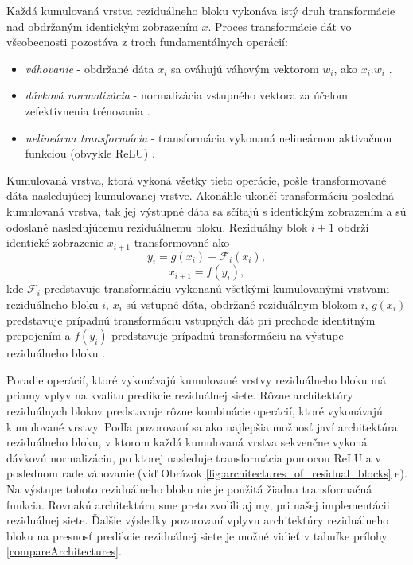 Každá kumulovaná vrstva reziduálneho bloku vykonáva istý druh transformácie nad obdržaným identickým zobrazením $x$. Proces transformácie dát vo všeobecnosti pozostáva z troch fundamentálnych operácií:
\begin{itemize}
    \item \textit{váhovanie} - obdržané dáta $x_i$ sa ováhujú váhovým vektorom $w_i$, ako $x_i . w_i$ \cite{He2016, Goh1995}.
    \item \textit{dávková normalizácia} - normalizácia vstupného vektora za účelom zefektívnenia trénovania \cite{Ioffe2015, Goh1995}.
    \item \textit{nelineárna transformácia} - transformácia vykonaná nelineárnou aktivačnou funkciou (obvykle ReLU) \cite{Xu2015, Goh1995}.
\end{itemize}
Kumulovaná vrstva, ktorá vykoná všetky tieto operácie, pošle transformované dáta nasledujúcej kumulovanej vrstve. Akonáhle ukončí transformáciu posledná kumulovaná vrstva, tak jej výstupné dáta sa sčítajú s identickým zobrazením a sú odoslané nasledujúcemu reziduálnemu bloku. Reziduálny blok $i+1$ obdrží identické zobrazenie $x_{i+1}$ transformované ako
\[y_i=g(x_i)+\mathcal{F}_i(x_i),\]
\[x_{i+1}=f(y_i),\]
kde $\mathcal{F}_i$ predstavuje transformáciu vykonanú všetkými kumulovanými vrstvami reziduálneho bloku $i$, $x_i$ sú vstupné dáta, obdržané reziduálnym blokom $i$, $g(x_i)$ predstavuje prípadnú transformáciu vstupných dát pri prechode identitným prepojením a $f(y_i)$ predstavuje prípadnú transformáciu na výstupe reziduálneho bloku \cite{Wu2017, He2016}.

Poradie operácií, ktoré vykonávajú kumulované vrstvy reziduálneho bloku má priamy vplyv na kvalitu predikcie reziduálnej siete. Rôzne architektúry reziduálnych blokov predstavuje rôzne kombinácie operácií, ktoré vykonávajú kumulované vrstvy. Podľa pozorovaní \cite{He2016} sa ako najlepšia možnosť javí architektúra reziduálneho bloku, v ktorom každá kumulovaná vrstva sekvenčne vykoná dávkovú normalizáciu, po ktorej nasleduje transformácia pomocou ReLU a v poslednom rade váhovanie (viď Obrázok \ref{fig:architectures_of_residual_blocks} e). Na výstupe tohoto reziduálneho bloku nie je použitá žiadna transformačná funkcia. Rovnakú architektúru sme preto zvolili aj my, pri našej implementácii reziduálnej siete. Ďalšie výsledky pozorovaní vplyvu architektúry reziduálneho bloku na presnosť predikcie reziduálnej siete je možné vidieť v tabuľke prílohy \ref{compareArchitectures}.

